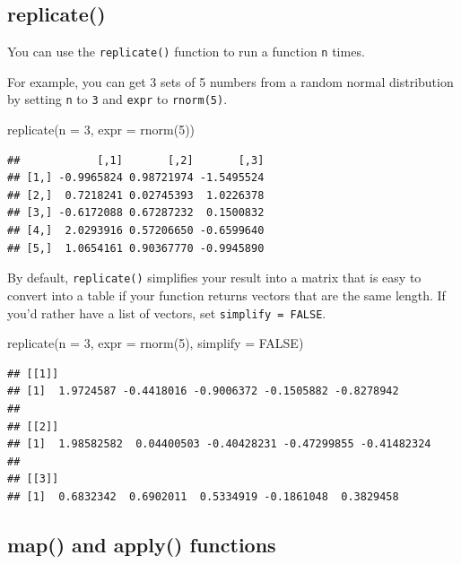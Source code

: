 \documentclass[
  oneside]{book}
\newenvironment{Shaded}{\begin{snugshade}}{\end{snugshade}}
\newcommand{\AttributeTok}[1]{\textcolor[rgb]{0.77,0.63,0.00}{#1}}
\newcommand{\ConstantTok}[1]{\textcolor[rgb]{0.00,0.00,0.00}{#1}}
\newcommand{\DecValTok}[1]{\textcolor[rgb]{0.00,0.00,0.81}{#1}}
\newcommand{\FunctionTok}[1]{\textcolor[rgb]{0.00,0.00,0.00}{#1}}
\newcommand{\NormalTok}[1]{#1}
\begin{document}
\hypertarget{replicate}{%
\subsection{replicate()}\label{replicate}}

You can use the \texttt{replicate()} function to run a function \texttt{n} times.

For example, you can get 3 sets of 5 numbers from a random normal distribution by setting \texttt{n} to \texttt{3} and \texttt{expr} to \texttt{rnorm(5)}.

\begin{Shaded}
\begin{Highlighting}[]
\FunctionTok{replicate}\NormalTok{(}\AttributeTok{n =} \DecValTok{3}\NormalTok{, }\AttributeTok{expr =} \FunctionTok{rnorm}\NormalTok{(}\DecValTok{5}\NormalTok{))}
\end{Highlighting}
\end{Shaded}

\begin{verbatim}
##            [,1]       [,2]       [,3]
## [1,] -0.9965824 0.98721974 -1.5495524
## [2,]  0.7218241 0.02745393  1.0226378
## [3,] -0.6172088 0.67287232  0.1500832
## [4,]  2.0293916 0.57206650 -0.6599640
## [5,]  1.0654161 0.90367770 -0.9945890
\end{verbatim}

By default, \texttt{replicate()} simplifies your result into a matrix that is easy to convert into a table if your function returns vectors that are the same length. If you'd rather have a list of vectors, set \texttt{simplify\ =\ FALSE}.

\begin{Shaded}
\begin{Highlighting}[]
\FunctionTok{replicate}\NormalTok{(}\AttributeTok{n =} \DecValTok{3}\NormalTok{, }\AttributeTok{expr =} \FunctionTok{rnorm}\NormalTok{(}\DecValTok{5}\NormalTok{), }\AttributeTok{simplify =} \ConstantTok{FALSE}\NormalTok{)}
\end{Highlighting}
\end{Shaded}

\begin{verbatim}
## [[1]]
## [1]  1.9724587 -0.4418016 -0.9006372 -0.1505882 -0.8278942
## 
## [[2]]
## [1]  1.98582582  0.04400503 -0.40428231 -0.47299855 -0.41482324
## 
## [[3]]
## [1]  0.6832342  0.6902011  0.5334919 -0.1861048  0.3829458
\end{verbatim}

\hypertarget{map-apply}{%
\subsection{map() and apply() functions}\label{map-apply}}
\end{document}
